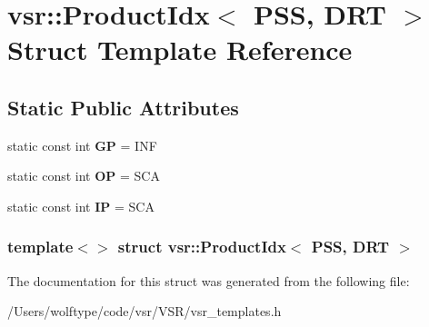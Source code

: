 \hypertarget{structvsr_1_1_product_idx_3_01_p_s_s_00_01_d_r_t_01_4}{\section{vsr\-:\-:Product\-Idx$<$ P\-S\-S, D\-R\-T $>$ Struct Template Reference}
\label{structvsr_1_1_product_idx_3_01_p_s_s_00_01_d_r_t_01_4}
}
\subsection*{Static Public Attributes}
\begin{DoxyCompactItemize}
\item 
\hypertarget{structvsr_1_1_product_idx_3_01_p_s_s_00_01_d_r_t_01_4_abc8e21e56b84cbe335c301f87ea0bba1}{static const int {\bfseries G\-P} = I\-N\-F}\label{structvsr_1_1_product_idx_3_01_p_s_s_00_01_d_r_t_01_4_abc8e21e56b84cbe335c301f87ea0bba1}

\item 
\hypertarget{structvsr_1_1_product_idx_3_01_p_s_s_00_01_d_r_t_01_4_af2bc6e311f7227de9b5ffc9751c1773f}{static const int {\bfseries O\-P} = S\-C\-A}\label{structvsr_1_1_product_idx_3_01_p_s_s_00_01_d_r_t_01_4_af2bc6e311f7227de9b5ffc9751c1773f}

\item 
\hypertarget{structvsr_1_1_product_idx_3_01_p_s_s_00_01_d_r_t_01_4_ad7d40fd711423d7bc3e349318e699e21}{static const int {\bfseries I\-P} = S\-C\-A}\label{structvsr_1_1_product_idx_3_01_p_s_s_00_01_d_r_t_01_4_ad7d40fd711423d7bc3e349318e699e21}

\end{DoxyCompactItemize}
\subsubsection*{template$<$$>$ struct vsr\-::\-Product\-Idx$<$ P\-S\-S, D\-R\-T $>$}



The documentation for this struct was generated from the following file\-:\begin{DoxyCompactItemize}
\item 
/\-Users/wolftype/code/vsr/\-V\-S\-R/vsr\-\_\-templates.\-h\end{DoxyCompactItemize}
